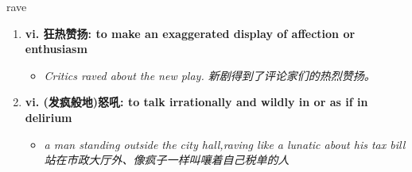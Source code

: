 
\begin{frame}
{\huge rave}
\begin{center}
\begin{enumerate}\Large
  \item \textbf{vi. 狂热赞扬: to make an exaggerated display of affection or enthusiasm}
  \begin{itemize}
    \item \em{\Large{Critics raved about the new play. 新剧得到了评论家们的热烈赞扬。}}
  \end{itemize}
  \item \textbf{vi. (发疯般地)怒吼: to talk irrationally and wildly in or as if in delirium}
  \begin{itemize}
    \item \em{\Large{a man standing outside the city hall,raving like a lunatic about his tax bill 站在市政大厅外、像疯子一样叫嚷着自己税单的人}}
  \end{itemize}
\end{enumerate}
\end{center}
\end{frame}
